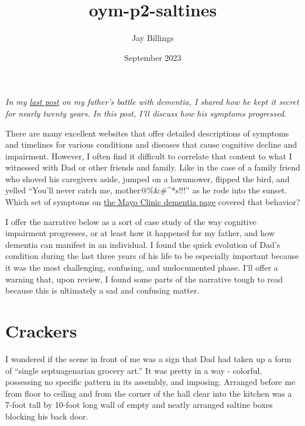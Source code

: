 \documentclass{article}
\title{oym-p2-saltines}
\author{Jay Billings}
\date{September 2023}
\begin{document}
\maketitle

\textit{In my \href{https://jayjaybillings.com/2023/07/06/outliving-your-mind-part-1-the-secret/}{last post} on my father's battle with dementia, I shared how he kept it secret for nearly twenty years. In this post, I'll discuss how his symptoms progressed.}

There are many excellent websites that offer detailed descriptions of symptoms and timelines for various conditions and diseases that cause cognitive decline and impairment. However, I often find it difficult to correlate that content to what I witnessed with Dad or other friends and family. Like in the case of a family friend who shoved his caregivers aside, jumped on a lawnmower, flipped the bird, and yelled ``You'll never catch me, mother@\%\&\#\^\@*s!!!'' as he rode into the sunset. Which set of symptoms on \href{https://www.mayoclinic.org/diseases-conditions/dementia/symptoms-causes/syc-20352013}{the Mayo Clinic dementia page} covered that behavior?

I offer the narrative below as a sort of case study of the way cognitive impairment progresses, or at least how it happened for my father, and how dementia can manifest in an individual. I found the quick evolution of Dad's condition during the last three years of his life to be especially important because it was the most challenging, confusing, and undocumented phase. I'll offer a warning that, upon review, I found some parts of the narrative tough to read because this is ultimately a sad and confusing matter. 

\section*{Crackers}

I wondered if the scene in front of me was a sign that Dad had taken up a form of ``single septuagenarian grocery art.'' It was pretty in a way - colorful, possessing no specific pattern in its assembly, and imposing. Arranged before me from floor to ceiling and from the corner of the hall clear into the kitchen was a 7-foot tall by 10-foot long wall of empty and neatly arranged saltine boxes blocking his back door.
\end{document}
